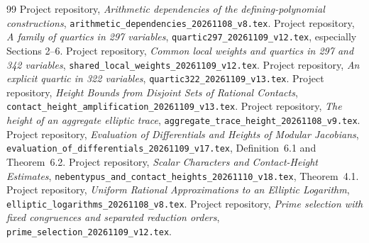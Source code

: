 \documentclass[11pt,a4paper]{article}
\begin{document}
\begin{thebibliography}{99}\small\setlength{\itemsep}{2pt}
 Project repository,
\emph{Arithmetic dependencies of the defining-polynomial constructions},
\nolinkurl{arithmetic_dependencies_20261108_v8.tex}.
 Project repository,
\emph{A family of quartics in 297 variables},
\nolinkurl{quartic297_20261109_v12.tex}, especially Sections 2--6.
 Project repository,
\emph{Common local weights and quartics in 297 and 342 variables},
\nolinkurl{shared_local_weights_20261109_v12.tex}.
 Project repository,
\emph{An explicit quartic in 322 variables},
\nolinkurl{quartic322_20261109_v13.tex}.
 Project repository,
\emph{Height Bounds from Disjoint Sets of Rational Contacts},
\nolinkurl{contact_height_amplification_20261109_v13.tex}.
 Project repository,
\emph{The height of an aggregate elliptic trace},
\nolinkurl{aggregate_trace_height_20261108_v9.tex}.
 Project repository,
\emph{Evaluation of Differentials and Heights of Modular Jacobians},
\nolinkurl{evaluation_of_differentials_20261109_v17.tex},
Definition~6.1 and Theorem~6.2.
 Project repository,
\emph{Scalar Characters and Contact-Height Estimates},
\nolinkurl{nebentypus_and_contact_heights_20261110_v18.tex},
Theorem~4.1.
 Project repository,
\emph{Uniform Rational Approximations to an Elliptic Logarithm},
\nolinkurl{elliptic_logarithms_20261108_v8.tex}.
 Project repository,
\emph{Prime selection with fixed congruences and separated reduction orders},
\nolinkurl{prime_selection_20261109_v12.tex}.
\end{thebibliography}
\end{document}
